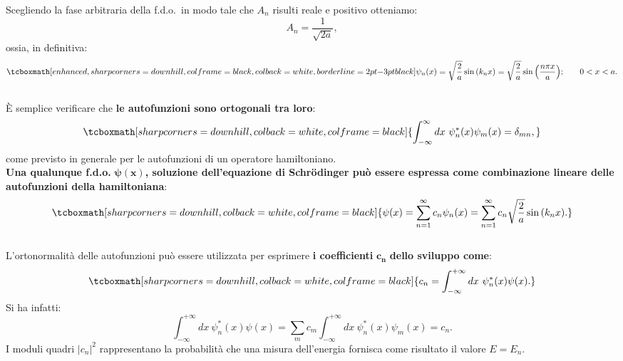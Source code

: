 \documentclass[a4paper,12pt,oneside]{book}
\begin{document}
Scegliendo la fase arbitraria della f.d.o.~in modo tale che $A_n$ risulti reale e positivo otteniamo:
	\begin{equation}
		A_n = \frac{1}{\sqrt{2a}},
	\end{equation}
ossia, in definitiva:
	\begin{equation}
		\tcboxmath[enhanced, sharp corners=downhill, colframe=black, colback=white, borderline={2pt}{-3pt}{black}]{
			\psi _n (x)= \sqrt{\frac{2}{a}} \sin{\left( k_n x\right)} = \sqrt{\frac{2}{a}} \sin{\left( \frac{n \pi x}{a}\right)};
			} \qquad 0<x<a.
\end{equation}\\

È semplice verificare che \textbf{le autofunzioni sono ortogonali tra loro}:
	\begin{equation}
		\tcboxmath[sharp corners=downhill, colback=white, colframe=black]{
			\int _{-\infty} ^{\infty} dx\ \psi_n ^* (x) \psi _m (x) = \delta _{mn},
			}
	\end{equation}
come previsto in generale per le autofunzioni di un operatore hamiltoniano.\\ 

\textbf{Una qualunque f.d.o.} $\mathbf{\psi (x)}$\textbf{, soluzione dell'equazione di Schr\"{o}dinger può essere espressa come combinazione lineare delle autofunzioni della hamiltoniana}:
	\begin{equation}
		\tcboxmath[sharp corners=downhill, colback=white, colframe=black]{
			\psi (x) = \sum _{n=1} ^{\infty} c_n \psi _n (x) = \sum _{n=1} ^{\infty} c_n \sqrt{\frac{2}{a}} \sin {\left( k_n x \right)}.
			}
	\end{equation}\\
	
L'ortonormalità delle autofunzioni può essere utilizzata per esprimere \textbf{i coefficienti} $\mathbf{c_n}$ \textbf{dello sviluppo come}:
	\begin{equation}
		\tcboxmath[sharp corners=downhill, colback=white, colframe=black]{
			c_n = \int _{-\infty} ^{+\infty} dx\ \psi _n ^* (x) \psi(x).
			}
	\end{equation}
Si ha infatti:
\begin{equation}
\int _{-\infty} ^{+\infty} dx\ \psi _n ^* (x) \psi(x)= \sum _m c_m \int _{-\infty} ^{+\infty} dx\ \psi _n ^* (x) \psi _m(x)= c_n.
\end{equation}
I moduli quadri $|c_n|^2$ rappresentano la probabilità che una misura dell'energia fornisca come risultato il valore $E=E_n$.\\
\end{document}
